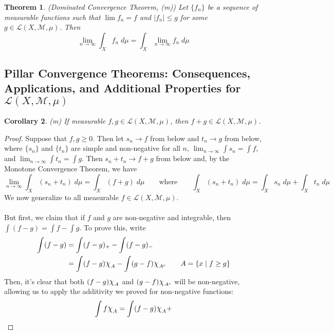 \documentclass[12pt]{article}
\theoremstyle{plain}
\newtheorem{thm}{Theorem}[subsection]
\newtheorem{cor}[thm]{Corollary}
\theoremstyle{definition}
\theoremstyle{remark}
\newcommand*{\Chi}{\mbox{\large$\chi$}} %
\begin{document}
\begin{thm} \emph{(Dominated Convergence Theorem, (m))}  
Let $\{f_n\}$ be a sequence of measurable functions such that $\lim f_n = f$ and $|f_n|\leq g$ for some $g\in\mathscr{L}(X,\mathscr{M},\mu)$. Then
\[
    \lim_{n\rightarrow\infty} \int_X f_n \; d\mu
    = \int_X \lim_{n\rightarrow\infty}f_n \; d\mu
\]
\end{thm}

\newpage
\subsection{Pillar Convergence Theorems: Consequences, Applications, and Additional Properties for $\mathscr{L}(X,\mathscr{M},\mu)$}

\begin{cor} 
\label{lebadd}    
\emph{(m)}
If measurable $f,g\in\mathscr{L}(X,\mathscr{M},\mu)$, then $f+g\in\mathscr{L}(X,\mathscr{M},\mu)$.
\end{cor} 
\begin{proof}
    Suppose that $f,g\geq 0$. Then let $s_n{\rightarrow} f$ from below and $t_n{\rightarrow} g$ from below, where $\{s_n\}$ and $\{t_n\}$ are simple and non-negative for all $n$, $\lim_{n\rightarrow\infty}\int s_n = \int f$, and $\lim_{n\rightarrow\infty}\int t_n=\int g$. Then $s_n+t_n\rightarrow f+g$ from below and, by the Monotone Convergence Theorem, we have 
\[
    \lim_{n\rightarrow\infty}   
    \int_X (s_n+t_n)\;d\mu = \int_X (f+g)\;d\mu 
    \qquad \text{where}\qquad
    \int_X (s_n + t_n)\;d\mu
    = \int_X s_n \;d\mu+ \int_X t_n\;d\mu
\]
We now generalize to all measurable $f\in\mathscr{L}(X,\mathscr{M},\mu)$. 
\\
\\
But first, we claim that if $f$ and $g$ are non-negative and integrable, then $\int (f-g) = \int f - \int g$. To prove this, write
\begin{align*}
    \int (f-g) &= \int (f-g)_+ - \int (f-g)_- \\
    &= \int (f-g)\Chi_A - \int (g-f) \Chi_{A^c}
    \qquad A = \{x \;|\; f\geq g\}
\end{align*}
Then, it's clear that both $(f-g)\Chi_A$ and $(g-f)\Chi_{A^c}$ will be non-negative, allowing us to apply the additivity we proved for non-negative functions: 
\[
    \int f\Chi_A = \int (f-g) \Chi_A + 
\]





\end{proof}
\end{document}
